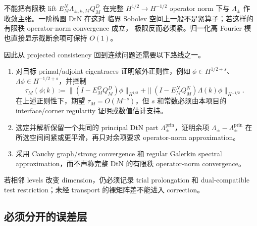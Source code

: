 \documentclass[UTF8,fontset=fandol,11pt,a4paper]{ctexart}
\begin{document}
不能把有限秩 lift $E_M^N\Lambda_{\pm,h,M}Q_M^D$ 在完整
$H^{1/2}\to H^{-1/2}$ operator norm 下与 $\Lambda_\pm$ 作收敛主张。一阶椭圆 DtN 在这对
临界 Sobolev 空间上一般不是紧算子；若这样的有限秩 operator-norm convergence 成立，
极限反而必须紧。归一化高 Fourier 模也直接显示截断余项可保持 $O(1)$。

因此从 projected consistency 回到连续问题还需要以下路线之一。
\begin{enumerate}
  \item 对目标 primal/adjoint eigentraces 证明额外正则性，例如
  $\phi\in H^{1/2+s}$、$\Lambda\phi\in H^{-1/2+s}$，并控制
  \begin{equation}
    \tau_M(\phi;k):=
    \|(I-E_M^DQ_M^D)\phi\|_{H^{1/2}}
    +\|(I-E_M^NQ_M^N)\Lambda(k)\phi\|_{H^{-1/2}}.
    \label{eq:trace-tail}
  \end{equation}
  在上述正则性下，期望 $\tau_M=O(M^{-s})$，但 $s$ 和常数必须由本项目的
  interface/corner regularity 证明或数值估计支持。
  \item 选定并解析保留一个共同的 principal DtN part
  $\Lambda_\pm^{\mathrm{prin}}$，证明余项
  $\Lambda_\pm-\Lambda_\pm^{\mathrm{prin}}$ 在所选空间间紧或更平滑，再只对余项要求
  operator-norm approximation。
  \item 采用 Cauchy graph/strong convergence 和 regular Galerkin spectral
  approximation，而不声称完整 DtN 的有限秩 operator-norm convergence。
\end{enumerate}
若相邻 levels 改变 dimension，仍必须记录 trial prolongation 和 dual-compatible test
restriction；未经 transport 的裸矩阵差不能进入 correction。

\subsection{必须分开的误差层}
\end{document}
